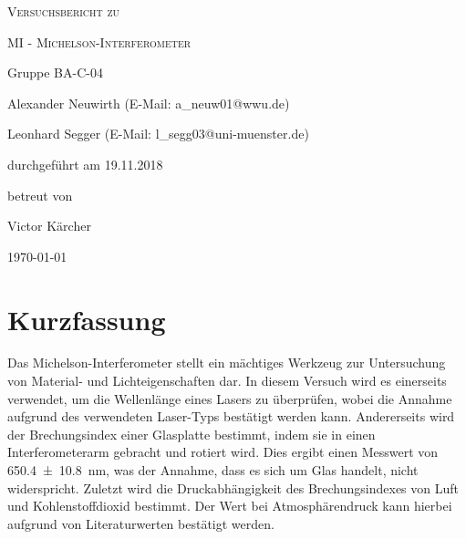 \documentclass[
	a4paper,
	12pt,
	pagesize,
	ngerman
]{scrartcl}
\begin{document}
	\begin{titlepage}
		\centering
		{\scshape\LARGE Versuchsbericht zu \par}
		\vspace{1cm}
		{\scshape\huge MI - Michelson-Interferometer \par} %
		\vspace{2.5cm}
		{\LARGE Gruppe BA-C-04 \par}
		\vspace{0.5cm}

		{\large Alexander Neuwirth (E-Mail: a\_neuw01@wwu.de) \par}
		{\large Leonhard Segger (E-Mail: l\_segg03@uni-muenster.de) \par}
		\vfill

		durchgeführt am 19.11.2018\par
		betreut von\par
		{\large Victor Kärcher} %

		\vfill

		{\large \today\par}
	\end{titlepage}
	\tableofcontents
	\newpage


	\section{Kurzfassung}
	Das Michelson-Interferometer stellt ein mächtiges Werkzeug zur Untersuchung von Material- und Lichteigenschaften dar.
	In diesem Versuch wird es einerseits verwendet, um die Wellenlänge eines Lasers zu überprüfen, wobei die Annahme aufgrund des verwendeten Laser-Typs bestätigt werden kann.
	Andererseits wird der Brechungsindex einer Glasplatte bestimmt, indem sie in einen Interferometerarm gebracht und rotiert wird.
	Dies ergibt einen Messwert von \SI{650,4+-10,8}{nm}, was der Annahme, dass es sich um Glas handelt, nicht widerspricht. %
	Zuletzt wird die Druckabhängigkeit des Brechungsindexes von Luft und Kohlenstoffdioxid bestimmt.
	Der Wert bei Atmosphärendruck kann hierbei aufgrund von Literaturwerten bestätigt werden.
\end{document}
